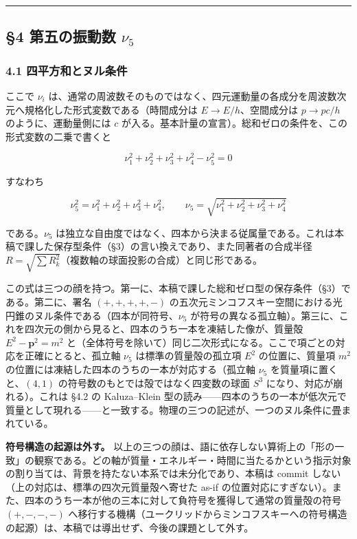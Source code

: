 \documentclass[
]{ltjsarticle}
\begin{document}
\begin{center}\rule{0.5\linewidth}{0.5pt}\end{center}

\subsection{\texorpdfstring{§4 第五の振動数
\(\nu_5\)}{§4 第五の振動数 \textbackslash nu\_5}}\label{ux7b2cux4e94ux306eux632fux52d5ux6570-nu_5}

\subsubsection{4.1
四平方和とヌル条件}\label{ux56dbux5e73ux65b9ux548cux3068ux30ccux30ebux6761ux4ef6}

ここで \(\nu_i\)
は、通常の周波数そのものではなく、四元運動量の各成分を周波数次元へ規格化した形式変数である（時間成分は
\(E\to E/h\)、空間成分は \(p\to pc/h\) のように、運動量側には \(c\)
が入る。基本計量の宣言）。総和ゼロの条件を、この形式変数の二乗で書くと

\[\nu_1^2+\nu_2^2+\nu_3^2+\nu_4^2-\nu_5^2=0\]

すなわち

\[\nu_5^2=\nu_1^2+\nu_2^2+\nu_3^2+\nu_4^2,\qquad \nu_5=\sqrt{\nu_1^2+\nu_2^2+\nu_3^2+\nu_4^2}\]

である。\(\nu_5\)
は独立な自由度ではなく、四本から決まる従属量である。これは本稿で課した保存型条件（§3）の言い換えであり、また同著者の合成半径
\(R=\sqrt{\sum R_k^2}\)（複数軸の球面投影の合成）と同じ形である。

この式は三つの顔を持つ。第一に、本稿で課した総和ゼロ型の保存条件（§3）である。第二に、署名
\((+,+,+,+,-)\)
の五次元ミンコフスキー空間における光円錐のヌル条件である（四本が同符号、\(\nu_5\)
が符号の異なる孤立軸）。第三に、これを四次元の側から見ると、四本のうち一本を凍結した像が、質量殻
\(E^2-\boldsymbol{p}^2=m^2\)
と（全体符号を除いて）同じ二次形式になる。ここで項ごとの対応を正確にとると、孤立軸
\(\nu_5\) は標準の質量殻の孤立項 \(E^2\) の位置に、質量項 \(m^2\)
の位置には凍結した四本のうちの一本が対応する（孤立軸 \(\nu_5\)
を質量項に置くと、\((4,1)\) の符号数のもとでは殻ではなく四変数の球面
\(S^3\) になり、対応が崩れる）。これは §4.2 の Kaluza--Klein
型の読み------四本のうちの一本が低次元で質量として現れる------と一致する。物理の三つの記述が、一つのヌル条件に畳まれている。

\textbf{符号構造の起源は外す。}
以上の三つの顔は、語に依存しない算術上の「形の一致」の観察である。どの軸が質量・エネルギー・時間に当たるかという指示対象の割り当ては、背景を持たない本系では未分化であり、本稿は
commit しない（上の対応は、標準の四次元質量殻へ寄せた as-if
の位置対応にすぎない）。また、四本のうち一本が他の三本に対して負符号を獲得して通常の質量殻の符号
\((+,-,-,-)\)
へ移行する機構（ユークリッドからミンコフスキーへの符号構造の起源）は、本稿では導出せず、今後の課題として外す。
\end{document}
